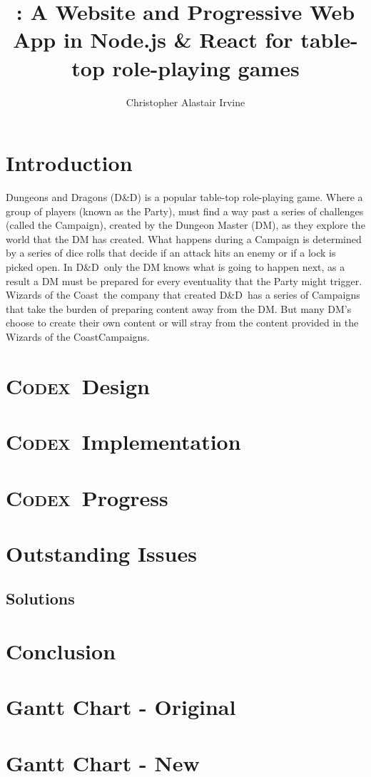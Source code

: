 \documentclass[progress]{cmpreport}
\title{\Codex: A Website and Progressive Web App in Node.js \& React for table-top role-playing games}
\author{Christopher Alastair Irvine}
\newcommand{\WotC}{Wizards of the Coast}
\newcommand{\dnd}{D\&D}
\newcommand{\Codex}{\textsc{Codex}}
\begin{document}
	\section{Introduction} \label{intro}
	Dungeons and Dragons (\dnd) is a popular table-top role-playing game. Where a group of players (known as the Party), must find a way past a series of challenges (called the Campaign), created by the Dungeon Master (DM), as they explore the world that the DM has created. What happens during a Campaign is determined by a series of dice rolls that decide if an attack hits an enemy or if a lock is picked open. 
	In \dnd \ only the DM knows what is going to happen next, as a result a DM must be prepared for every eventuality that the Party might trigger. \WotC \, the company that created \dnd \ has a series of Campaigns that take the burden of preparing content away from the DM. But many DM's choose to create their own content or will stray from the content provided in the \WotC Campaigns. 
	
	\section{\Codex \ Design}
	
	\section{\Codex \ Implementation}
	
	\section{\Codex \ Progress}
	
	\section{Outstanding Issues}
		\subsection{Solutions}
		
	\section{Conclusion}
	
	\appendix
	\section{Gantt Chart - Original}
	\section{Gantt Chart - New}
	

\end{document}
